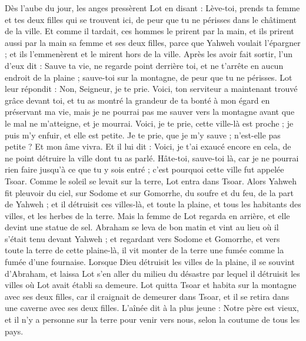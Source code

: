 \begin{multicols}{2}
Dès l’aube du jour, les anges pressèrent Lot en disant : Lève-toi, prends ta femme et tes deux filles qui se trouvent ici, de peur que tu ne périsses dans le châtiment de la ville.
Et comme il tardait, ces hommes le prirent par la main, et ils prirent aussi par la main sa femme et ses deux filles, parce que Yahweh voulait l'épargner ; et ils l'emmenèrent et le mirent hors de la ville.
Après les avoir fait sortir, l'un d’eux dit : Sauve ta vie, ne regarde point derrière toi, et ne t'arrête en aucun endroit de la plaine ; sauve-toi sur la montagne, de peur que tu ne périsses.
Lot leur répondit : Non, Seigneur, je te prie.
Voici, ton serviteur a maintenant trouvé grâce devant toi, et tu as montré la grandeur de ta bonté à mon égard en préservant ma vie, mais je ne pourrai pas me sauver vers la montagne avant que le mal ne m'atteigne, et je mourrai.
Voici, je te prie, cette ville-là est proche ; je puis m'y enfuir, et elle est petite. Je te prie, que je m'y sauve ; n'est-elle pas petite ? Et mon âme vivra.
Et il lui dit : Voici, je t'ai exaucé encore en cela, de ne point détruire la ville dont tu as parlé.
Hâte-toi, sauve-toi là, car je ne pourrai rien faire jusqu'à ce que tu y sois entré ; c'est pourquoi cette ville fut appelée Tsoar.
Comme le soleil se levait sur la terre, Lot entra dans Tsoar.
Alors Yahweh fit pleuvoir du ciel, sur Sodome et sur Gomorrhe, du soufre et du feu, de la part de Yahweh ;
et il détruisit ces villes-là, et toute la plaine, et tous les habitants des villes, et les herbes de la terre.
Mais la femme de Lot regarda en arrière, et elle devint une statue de sel.
Abraham se leva de bon matin et vint au lieu où il s'était tenu devant Yahweh ;
et regardant vers Sodome et Gomorrhe, et vers toute la terre de cette plaine-là, il vit monter de la terre une fumée comme la fumée d'une fournaise.
Lorsque Dieu détruisit les villes de la plaine, il se souvint d'Abraham, et laissa Lot s’en aller  du milieu du désastre par lequel il détruisit les villes où Lot avait établi sa demeure.
Lot quitta Tsoar et habita sur la montagne avec ses deux filles, car il craignait de demeurer dans Tsoar, et il se retira dans une caverne avec ses deux filles.
L'aînée dit à la plus jeune : Notre père est vieux, et il n'y a personne sur la terre pour venir vers nous, selon la coutume de tous les pays.

\end{multicols}
